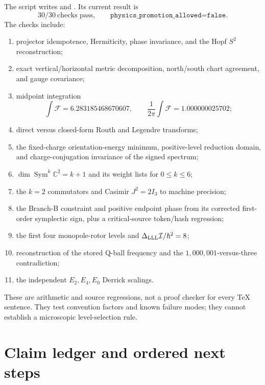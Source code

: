 \documentclass[11pt]{article}
\numberwithin{equation}{section}
\newcommand{\CC}{\mathbb C}
\newcommand{\cI}{\mathcal I}
\newcommand{\Sym}{\operatorname{Sym}}
\begin{document}
The script
 writes
 and
.  Its current result is
\begin{equation}
 \boxed{30/30\ \text{checks pass},\qquad
 \texttt{physics\_promotion\_allowed=false}.}
 \label{eq:auditstatus}
\end{equation}
The checks include:
\begin{enumerate}
\item projector idempotence, Hermiticity, phase invariance, and the Hopf
\(S^2\) reconstruction;
\item exact vertical/horizontal metric decomposition, north/south chart
agreement, and gauge covariance;
\item midpoint integration
\begin{equation}
 \int\mathcal F=6.283185468670607,
 \qquad \frac{1}{2\pi}\int\mathcal F=1.000000025702;
\end{equation}
\item direct versus closed-form Routh and Legendre transforms;
\item the fixed-charge orientation-energy minimum, positive-level reduction
domain, and charge-conjugation invariance of the signed spectrum;
\item \(\dim\Sym^k\CC^2=k+1\) and its weight lists for \(0\le k\le6\);
\item the \(k=2\) commutators and Casimir \(J^2=2I_3\) to machine precision;
\item the Branch-B constraint and positive endpoint phase from its corrected
first-order symplectic sign, plus a critical-source token/hash regression;
\item the first four monopole-rotor levels and
\(\Delta_{\rm LLL}\cI/\hbar^2=8\);
\item reconstruction of the stored Q-ball frequency and the
\(1{,}000{,}001\)-versus-three contradiction;
\item the independent \(E_2,E_4,E_0\) Derrick scalings.
\end{enumerate}
These are arithmetic and source regressions, not a proof checker for every TeX
sentence.  They test convention factors and known failure modes; they cannot
establish a microscopic level-selection rule.

\section{Claim ledger and ordered next steps}
\end{document}

